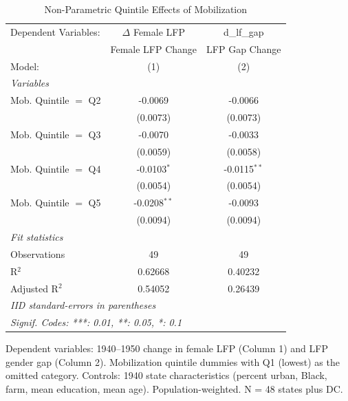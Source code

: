 
\begin{table}[htbp]
   \caption{\label{tab:quintile} Non-Parametric Quintile Effects of Mobilization}
   \centering
   \begin{tabular}{lcc}
      \tabularnewline \midrule \midrule
      Dependent Variables: & $\Delta$ Female LFP  & d\_lf\_gap\\    
                           & Female LFP Change    & LFP Gap Change \\   
      Model:               & (1)                  & (2)\\  
      \midrule
      \emph{Variables}\\
      Mob. Quintile $=$ Q2 & -0.0069              & -0.0066\\   
                           & (0.0073)             & (0.0073)\\   
      Mob. Quintile $=$ Q3 & -0.0070              & -0.0033\\   
                           & (0.0059)             & (0.0058)\\   
      Mob. Quintile $=$ Q4 & -0.0103$^{*}$        & -0.0115$^{**}$\\   
                           & (0.0054)             & (0.0054)\\   
      Mob. Quintile $=$ Q5 & -0.0208$^{**}$       & -0.0093\\   
                           & (0.0094)             & (0.0094)\\   
      \midrule
      \emph{Fit statistics}\\
      Observations         & 49                   & 49\\  
      R$^2$                & 0.62668              & 0.40232\\  
      Adjusted R$^2$       & 0.54052              & 0.26439\\  
      \midrule \midrule
      \multicolumn{3}{l}{\emph{IID standard-errors in parentheses}}\\
      \multicolumn{3}{l}{\emph{Signif. Codes: ***: 0.01, **: 0.05, *: 0.1}}\\
   \end{tabular}
   
   \par \raggedright 
   Dependent variables: 1940--1950 change in female LFP (Column 1) and LFP gender gap (Column 2). Mobilization quintile dummies with Q1 (lowest) as the omitted category. Controls: 1940 state characteristics (percent urban, Black, farm, mean education, mean age). Population-weighted. N = 48 states plus DC.
\end{table}


